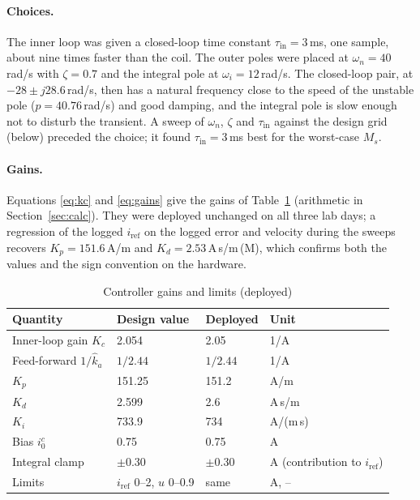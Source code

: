 \documentclass[11pt,a4paper]{article}
\newcommand{\st}[1]{\,\textup{(#1)}}
\begin{document}
\paragraph{Choices.} The inner loop was given a closed-loop time constant $\tau_{\mathrm{in}} = 3$\,ms, one sample, about nine
times faster than the coil. The outer poles were placed at $\omega_n = 40$\,rad/s with $\zeta = 0.7$ and the integral pole at
$\omega_i = 12$\,rad/s. The closed-loop pair, at $-28 \pm j28.6$\,rad/s, then has a natural frequency close to the speed of the
unstable pole ($p = 40.76$\,rad/s) and good damping, and the integral pole is slow enough not to disturb the transient. A sweep of
$\omega_n$, $\zeta$ and $\tau_{\mathrm{in}}$ against the design grid (below) preceded the choice; it found $\tau_{\mathrm{in}}=3$\,ms
best for the worst-case $M_s$. 

\paragraph{Gains.} Equations \eqref{eq:kc} and \eqref{eq:gains} give the gains of Table~\ref{tab:gains} (arithmetic in
Section~\ref{sec:calc}). They were deployed unchanged on all three lab days; a regression of the logged $i_{\mathrm{ref}}$ on
the logged error and velocity during the sweeps recovers $K_p = 151.6$\,A/m and $K_d = 2.53$\,A\,s/m\st{M}, which confirms
both the values and the sign convention on the hardware.

\begin{table}[H]
\centering
\caption{Controller gains and limits (deployed)}
\label{tab:gains}
\begin{tabular}{@{}llll@{}}
\toprule
Quantity & Design value & Deployed & Unit \\
\midrule
Inner-loop gain $K_c$ & 2.054 & 2.05 & 1/A \\
Feed-forward $1/\hat k_a$ & $1/2.44$ & $1/2.44$ & 1/A \\
$K_p$ & 151.25 & 151.2 & A/m \\
$K_d$ & 2.599 & 2.6 & A\,s/m \\
$K_i$ & 733.9 & 734 & A/(m\,s) \\
Bias $i_0^c$ & 0.75 & 0.75 & A \\
Integral clamp & $\pm0.30$ & $\pm0.30$ & A (contribution to $i_{\mathrm{ref}}$) \\
Limits & $i_{\mathrm{ref}}$ 0--2, $u$ 0--0.9 & same & A, -- \\
\bottomrule
\end{tabular}
\end{table}
\end{document}
